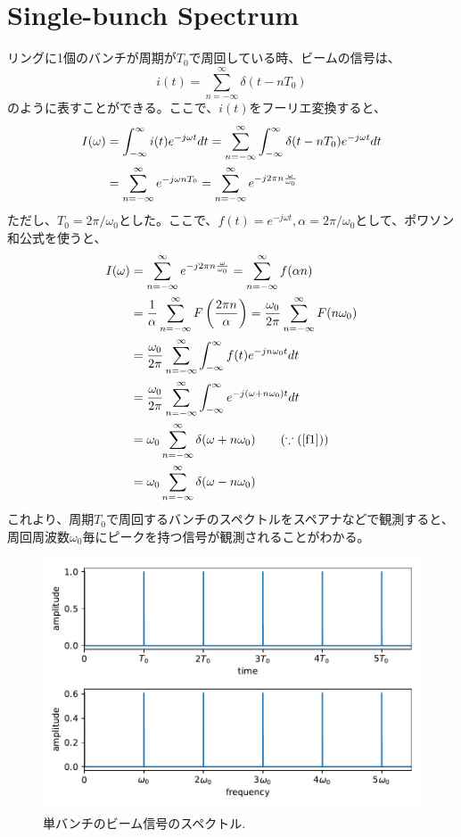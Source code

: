 \documentclass[]{jlreq}
\theoremstyle{definition}
\begin{document}
\section{Single-bunch Spectrum}
リングに1個のバンチが周期が$T_0$で周回している時、ビームの信号は、
%
\begin{equation}
  i(t) = \sum_{n=-\infty}^{\infty} \delta (t - n T_0 ) 
\end{equation}
%
のように表すことができる。ここで、$i(t)$をフーリエ変換すると、
%
\begin{align}
  I(\omega) &= \int_{-\infty}^{\infty} i(t) e^{-j \omega t} dt
    = \sum_{n=-\infty}^{\infty} \int_{-\infty}^{\infty} \delta (t - n T_0 ) e^{-j \omega t} dt \notag \\ 
    &= \sum_{n=-\infty}^{\infty} e^{-j\omega n T_0} = \sum_{n=-\infty}^{\infty} e^{-j 2\pi n \frac{\omega}{\omega_0}}
\end{align}
%
ただし、$T_0 = 2\pi / \omega_0$とした。ここで、$f(t) = e^{-j\omega t}, \alpha = 2\pi /\omega_0$として、ポワソン和公式を使うと、
%
\begin{align}
  I(\omega) &= \sum_{n=-\infty}^{\infty} e^{-j 2\pi n \frac{\omega}{\omega_0}} = \sum_{n=-\infty}^{\infty} f(\alpha n)\notag \\
    &= \frac{1}{\alpha} \sum_{n=-\infty}^{\infty} F\left( \frac{2 \pi n}{\alpha}\right) 
    = \frac{\omega_0}{2\pi} \sum_{n=-\infty}^{\infty} F(n \omega_0) \notag \\
    &= \frac{\omega_0}{2\pi} \sum_{n=-\infty}^{\infty} \int_{-\infty}^{\infty} f(t) e^{-j n \omega_0 t} dt \notag \\
    &= \frac{\omega_0}{2\pi} \sum_{n=-\infty}^{\infty} \int_{-\infty}^{\infty} e^{-j (\omega + n \omega_0) t} dt \notag \\
    &= \omega_0 \sum_{n=-\infty}^{\infty} \delta(\omega + n \omega_0) \qquad (\because (\ref{f1})) \notag \\
    &= \omega_0 \sum_{n=-\infty}^{\infty} \delta(\omega - n \omega_0)
\end{align}
%
これより、周期$T_0$で周回するバンチのスペクトルをスペアナなどで観測すると、周回周波数$\omega_0$毎にピークを持つ信号が観測されることがわかる。
%
\begin{figure}[hbt]
  \begin{center}
    \includegraphics[width=12cm,clip]{single_bunch.pdf}
    \caption{単バンチのビーム信号のスペクトル.}
   \label{single_bunch}
  \end{center}
\end{figure}
%
\end{document}
